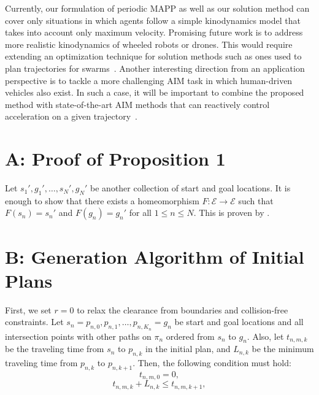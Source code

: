 \documentclass[letterpaper]{article} %
\begin{document}
Currently, our formulation of periodic MAPP as well as our solution method can cover only situations in which agents follow a simple kinodynamics model that takes into account only maximum velocity. Promising future work is to address more realistic kinodynamics of wheeled robots or drones. This would require extending an optimization technique for solution methods such as ones used to plan trajectories for swarms~\cite{honig2018trajectory}. Another interesting direction from an application perspective is to tackle a more challenging AIM task in which human-driven vehicles also exist. In such a case, it will be important to combine the proposed method with state-of-the-art AIM methods that can reactively control acceleration on a given trajectory~\cite{Kreidieh2018,Jang2019,Cui2021}.

\clearpage

\clearpage

\section{A: Proof of Proposition 1}
Let $s_1', g_1',\ldots, s_N', g_N'$ be another collection of start and goal locations. %
It is enough to show that there exists a homeomorphism $F:\mathcal{E} \rightarrow \mathcal{E}$ such that $F(s_n)=s_n'$ and $F(g_n)=g_n'$ for all $1\leq n \leq N$. This is proven by \citet{michor1994n}.

\section{B: Generation Algorithm of Initial Plans}
First, we set $r=0$ to relax the clearance from boundaries and collision-free constraints.
Let $s_n=p_{n, 0}, p_{n, 1}, \ldots, p_{n, K_n}=g_n$ be start and goal locations and all intersection points with other paths on $\pi_n$ ordered from $s_n$ to $g_n$. Also, let $t_{n,m,k}$ be the traveling time from $s_n$ to $p_{n,k}$ in the initial plan, and $L_{n,k}$ be the minimum traveling time from $p_{n,k}$ to $p_{n,k+1}$.
Then, the following condition must hold:
\begin{equation}\label{eq:zero condition}
    t_{n,m,0}=0,
\end{equation}
\begin{equation}\label{eq:L condition}
    t_{n,m,k}+L_{n,k}\leq t_{n,m,k+1},
\end{equation}
\end{document}
